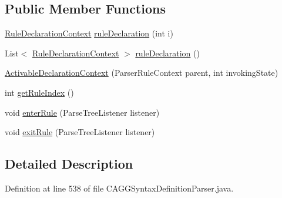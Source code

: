\subsection*{Public Member Functions}
\begin{DoxyCompactItemize}
\item 
\hyperlink{classit_1_1emarolab_1_1cagg_1_1core_1_1language_1_1parser_1_1ANTLRInterface_1_1ANTLRGenerated_1_632d39d35185b34ff726726c3c8fa6b6}{Rule\-Declaration\-Context} \hyperlink{classit_1_1emarolab_1_1cagg_1_1core_1_1language_1_1parser_1_1ANTLRInterface_1_1ANTLRGenerated_1_93958287407dacaab89eed30e6774005_a08326fce38ffaa20e9e37ada22852378}{rule\-Declaration} (int i)
\item 
List$<$ \hyperlink{classit_1_1emarolab_1_1cagg_1_1core_1_1language_1_1parser_1_1ANTLRInterface_1_1ANTLRGenerated_1_632d39d35185b34ff726726c3c8fa6b6}{Rule\-Declaration\-Context} $>$ \hyperlink{classit_1_1emarolab_1_1cagg_1_1core_1_1language_1_1parser_1_1ANTLRInterface_1_1ANTLRGenerated_1_93958287407dacaab89eed30e6774005_abcedc1cccb995f98c0a65d9b519b4448}{rule\-Declaration} ()
\item 
\hyperlink{classit_1_1emarolab_1_1cagg_1_1core_1_1language_1_1parser_1_1ANTLRInterface_1_1ANTLRGenerated_1_93958287407dacaab89eed30e6774005_a11ac73e5c653e31163f3f289de23df58}{Activable\-Declaration\-Context} (Parser\-Rule\-Context parent, int invoking\-State)
\item 
int \hyperlink{classit_1_1emarolab_1_1cagg_1_1core_1_1language_1_1parser_1_1ANTLRInterface_1_1ANTLRGenerated_1_93958287407dacaab89eed30e6774005_a4ab080313a59368863651f8d117f717b}{get\-Rule\-Index} ()
\item 
void \hyperlink{classit_1_1emarolab_1_1cagg_1_1core_1_1language_1_1parser_1_1ANTLRInterface_1_1ANTLRGenerated_1_93958287407dacaab89eed30e6774005_a8f42bd85ab80cf82e2dbfea692091e92}{enter\-Rule} (Parse\-Tree\-Listener listener)
\item 
void \hyperlink{classit_1_1emarolab_1_1cagg_1_1core_1_1language_1_1parser_1_1ANTLRInterface_1_1ANTLRGenerated_1_93958287407dacaab89eed30e6774005_ad0cc4a2ae790bf7ff6b20bc75bc88fac}{exit\-Rule} (Parse\-Tree\-Listener listener)
\end{DoxyCompactItemize}


\subsection{Detailed Description}


Definition at line 538 of file C\-A\-G\-G\-Syntax\-Definition\-Parser.\-java.



